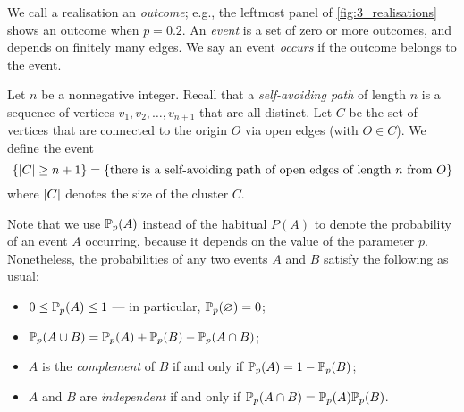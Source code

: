 \documentclass[a4paper, 12pt]{article}
\begin{document}
\begin{defn}\label{defn:outcome_and_event}
We call a realisation an \textit{outcome}; e.g., the leftmost panel of \cref{fig:3_realisations} shows an outcome when $p = 0.2$. An \textit{event} is a set of zero or more outcomes, and depends on finitely many edges. We say an event \textit{occurs} if the outcome belongs to the event.
\end{defn}

\begin{ex}\label{ex:cluster_of_size_n}
Let $n$ be a nonnegative integer. Recall that a \textit{self-avoiding path} of length $n$ is a sequence of vertices $v_1, v_2, \dots, v_{n + 1}$ that are all distinct.
Let $C$ be the set of vertices that are connected to the origin $O$ via open edges (with $O \in C$). We define the event
\[
\{\lvert C \rvert \geq n + 1\}
= \{\text{there is a self-avoiding path of open edges of length } n \text{ from } O\}
\]
where $\lvert C \rvert$ denotes the size of the cluster $C$.

\end{ex}

Note that we use $\mathbb{P}_p(A)$ instead of the habitual $P(A)$ to denote the probability of an event $A$ occurring, because it depends on the value of the parameter $p$. Nonetheless, the probabilities of any two events $A$ and $B$ satisfy the following as usual:
\begin{itemize}
    \item $0 \leq \mathbb{P}_p(A) \leq 1$ --- in particular, $\mathbb{P}_p(\varnothing) = 0$;
    \item $\mathbb{P}_p(A \cup B) = \mathbb{P}_p(A) + \mathbb{P}_p(B) - \mathbb{P}_p(A \cap B)$;
    \item $A$ is the \textit{complement} of $B$ if and only if $\mathbb{P}_p(A) = 1 - \mathbb{P}_p(B)$;
    \item $A$ and $B$ are \textit{independent} if and only if $\mathbb{P}_p(A \cap B) = \mathbb{P}_p(A) \mathbb{P}_p(B)$.
\end{itemize}
\end{document}
